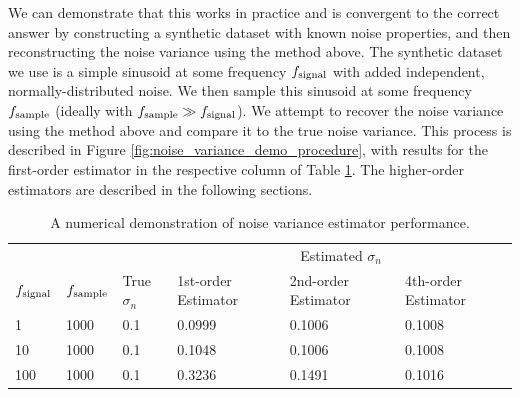 We can demonstrate that this works in practice and is convergent to the correct answer by constructing a synthetic dataset with known noise properties, and then reconstructing the noise variance using the method above. The synthetic dataset we use is a simple sinusoid at some frequency $f_{\rm signal}$ with added independent, normally-distributed noise. We then sample this sinusoid at some frequency $f_{\rm sample}$ (ideally with $f_{\rm sample} \gg f_{\rm signal}$). We attempt to recover the noise variance using the method above and compare it to the true noise variance. This process is described in Figure \ref{fig:noise_variance_demo_procedure}, with results for the first-order estimator in the respective column of Table \ref{tab:noise_variance_demo}. The higher-order estimators are described in the following sections.

\begin{table}[!h]
    \centering
    \caption{A numerical demonstration of noise variance estimator performance.}
    \label{tab:noise_variance_demo}
    \begin{tabular}{@{}lll|lll@{}}
        \toprule
        & & & \multicolumn{3}{c}{Estimated $\sigma_n$} \\
        $f_{\rm signal}$ & $f_{\rm sample}$ & True $\sigma_n$ & 1st-order Estimator & 2nd-order Estimator & 4th-order Estimator \\ \midrule
        1                & 1000             & 0.1             & 0.0999              & 0.1006              & 0.1008              \\
        10               & 1000             & 0.1             & 0.1048              & 0.1006              & 0.1008              \\
        100              & 1000             & 0.1             & 0.3236              & 0.1491              & 0.1016              \\ \bottomrule
    \end{tabular}
\end{table}


